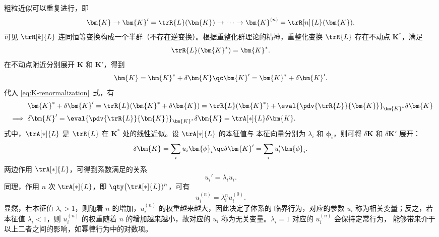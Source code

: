 粗粒近似可以重复进行，即
\begin{equation}
  \bm{K} \to \bm{K}' = \trR{L}(\bm{K}) \to \cdots \to \bm{K}^{(n)} = \trR[n]{L}(\bm{K}).
\end{equation}
可见 $\trR[k]{L}$ 连同恒等变换构成一个半群（不存在逆变换）。根据重整化群理论的精神，重整化变换
$\trR{L}$ 存在不动点 $\bm{K}^*$，满足
\begin{equation}
  \trR{L}(\bm{K}^*) = \bm{K}^*.
\end{equation}
在不动点附近分别展开 $\bm{K}$ 和 $\bm{K}'$，得到
\begin{equation}
  \bm{K}  = \bm{K}^* + \delta{\bm{K}} \qc
  \bm{K}' = \bm{K}^* + \delta{\bm{K}'}.
\end{equation}
代入 \eqref{eq:K-renormalization}~式，有
\begin{align}
  &\mathrel{\phantom{\implies}}
    \bm{K}^* + \delta{\bm{K}'}
  = \trR{L}(\bm{K}^* + \delta{\bm{K}})
  = \trR{L}(\bm{K}^*) + \eval{\pdv{\trR{L}}{\bm{K}}}_{\bm{K}^*} \delta{\bm{K}} \notag \\
  &\implies
    \delta{\bm{K}'}
  = \eval{\pdv{\trR{L}}{\bm{K}}}_{\bm{K}^*} \delta{\bm{K}}
  = \trA[*]{L} \delta{\bm{K}}.
\end{align}
式中，$\trA[*]{L}$ 是 $\trR{L}$ 在 $\bm{K}^*$ 处的线性近似。设 $\trA[*]{L}$ 的本征值与
本征向量分别为 $\lambda_i$ 和 $\bm{\phi}_i$，则可将 $\delta{\bm{K}}$ 和 $\delta{\bm{K}'}$ 展开：
\begin{equation}
  \delta{\bm{K}}  = \sum_i u_i  \bm{\phi}_i \qc
  \delta{\bm{K}'} = \sum_i u'_i \bm{\phi}_i.
\end{equation}
两边作用 $\trA[*]{L}$，可得到系数满足的关系
\begin{equation}
  u_i' = \lambda_i u_i.
\end{equation}
同理，作用 $n$ 次 $\trA[*]{L}$，即 $\qty\big(\trA[*]{L})^n$，可有
\begin{equation}
  u_i^{(n)} = \lambda_i^n u_i^{(0)}.
\end{equation}
显然，若本征值 $\lambda_i>1$，则随着 $n$ 的增加，$u_i^{(n)}$ 的权重越来越大，因此决定了体系的
临界行为，对应的参数 $u_i$ 称为相关变量；反之，若本征值 $\lambda_i<1$，则 $u_i^{(n)}$ 的权重随着
$n$ 的增加越来越小，故对应的 $u_i$ 称为无关变量。$\lambda_i=1$ 对应的 $u_i^{(n)}$ 会保持定常行为，
能够带来介于以上二者之间的影响，如幂律行为中的对数项。

